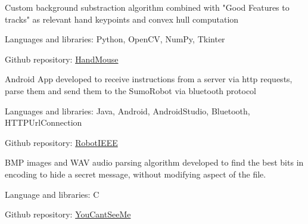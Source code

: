\documentclass[]{plushcv}
\begin{document}
\begin{minipage}[t]{0.70\textwidth}
\begin{tightemize}
\item Custom background substraction algorithm combined with "Good Features to tracks" as relevant hand keypoints and convex hull computation
\item Languages and libraries: Python, OpenCV, NumPy, Tkinter
\item Github repository:
\href{https://github.com/SimoneCaldarella/HandMouse}{HandMouse}
\end{tightemize}
\sectionsep

\begin{tightemize}
\item Android App developed to receive instructions from a server via http requests, parse them and send them to the SumoRobot via bluetooth protocol
\item Languages and libraries: Java, Android, AndroidStudio, Bluetooth, HTTPUrlConnection
\item Github repository:
\href{https://github.com/SimoneCaldarella/robotieeeApp/}{RobotIEEE}
\end{tightemize}
\sectionsep

\begin{tightemize}
\item BMP images and WAV audio parsing algorithm developed to find the best bits in encoding to hide a secret message, without modifying aspect of the file.
\item Language and libraries: C
\item Github repository:
\href{https://github.com/SimoneCaldarella/YouCantSeeMe}{YouCantSeeMe}
\end{tightemize}
\sectionsep



%
%

\end{minipage} 
\end{document}
